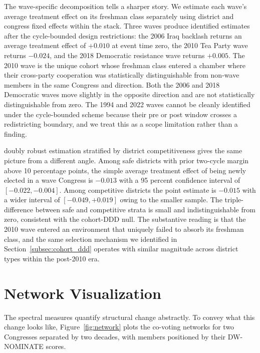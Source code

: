 \documentclass[12pt, a4paper]{article}
\begin{document}
The wave-specific decomposition tells a sharper story. We estimate each wave's average treatment effect on its freshman class separately using district and congress fixed effects within the stack. Three waves produce identified estimates after the cycle-bounded design restrictions: the 2006 Iraq backlash returns an average treatment effect of $+0.010$ at event time zero, the 2010 Tea Party wave returns $-0.024$, and the 2018 Democratic resistance wave returns $+0.005$. The 2010 wave is the unique cohort whose freshman class entered a chamber where their cross-party cooperation was statistically distinguishable from non-wave members in the same Congress and direction. Both the 2006 and 2018 Democratic waves move slightly in the opposite direction and are not statistically distinguishable from zero. The 1994 and 2022 waves cannot be cleanly identified under the cycle-bounded scheme because their pre or post window crosses a redistricting boundary, and we treat this as a scope limitation rather than a finding.

\citet{callawayetal2021} doubly robust estimation stratified by district competitiveness gives the same picture from a different angle. Among safe districts with prior two-cycle margin above 10 percentage points, the simple average treatment effect of being newly elected in a wave Congress is $-0.013$ with a 95 percent confidence interval of $[-0.022, -0.004]$. Among competitive districts the point estimate is $-0.015$ with a wider interval of $[-0.049, +0.019]$ owing to the smaller sample. The triple-difference between safe and competitive strata is small and indistinguishable from zero, consistent with the cohort-DDD null. The substantive reading is that the 2010 wave entered an environment that uniquely failed to absorb its freshman class, and the same selection mechanism we identified in Section~\ref{subsec:cohort_ddd} operates with similar magnitude across district types within the post-2010 era.

\section{Network Visualization}

The spectral measures quantify structural change abstractly. To convey what this change looks like, Figure~\ref{fig:network} plots the co-voting networks for two Congresses separated by two decades, with members positioned by their DW-NOMINATE scores.
\end{document}
